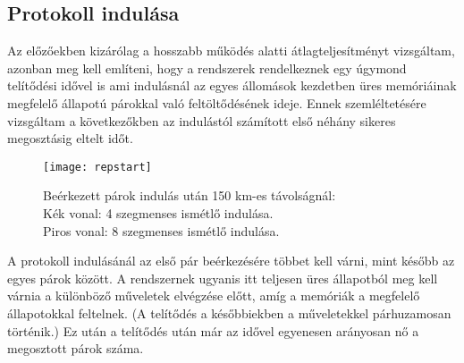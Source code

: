 \subsection{Protokoll indulása}
Az előzőekben kizárólag a hosszabb működés alatti átlagteljesítményt vizsgáltam, azonban meg kell említeni, hogy a rendszerek rendelkeznek egy úgymond telítődési idővel is ami indulásnál az egyes állomások kezdetben üres memóriáinak megfelelő állapotú párokkal való feltöltődésének ideje. Ennek szemléltetésére vizsgáltam a következőkben az indulástól számított első néhány sikeres megosztásig eltelt időt.
\begin{figure}[H]
\centering
\texttt{[image: repstart]}
\caption[Beérkezett párok indulás után]
{Beérkezett párok indulás után 150 km-es távolságnál:\\
Kék vonal: 4 szegmenses ismétlő indulása.\\
Piros vonal: 8 szegmenses  ismétlő indulása.
}
\end{figure}
A protokoll indulásánál az első pár beérkezésére többet kell várni, mint később az egyes párok között. A rendszernek ugyanis itt teljesen üres állapotból meg kell várnia a különböző műveletek elvégzése előtt, amíg a memóriák a megfelelő állapotokkal feltelnek. (A telítődés a későbbiekben a műveletekkel párhuzamosan történik.) Ez után a telítődés után már az idővel egyenesen arányosan nő a megosztott párok száma.
